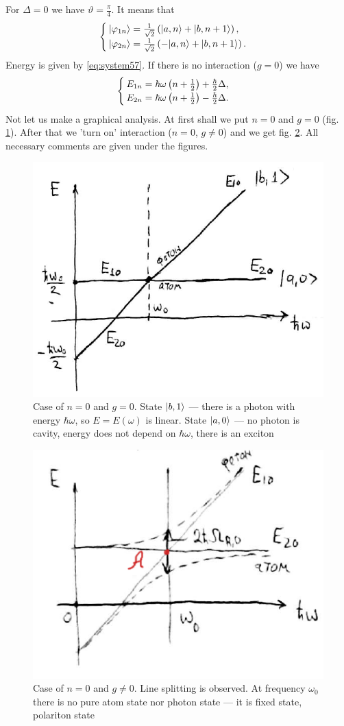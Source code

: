 For $\Delta = 0$ we have $\vartheta = \frac{\pi}{4}$. It means that
\begin{equation}
	\begin{cases}
		\lvert\varphi_{1n}\rangle = \frac{1}{\sqrt{2}} \left(\lvert a, n\rangle + \lvert b ,n +1\rangle\right), \\
		\lvert\varphi_{2n}\rangle = \frac{1}{\sqrt{2}}\left(-\lvert a, n\rangle + \lvert b ,n +1\rangle\right).
	\end{cases}
\end{equation}
Energy is given by \eqref{eq:system57}. If there is no interaction ($g = 0$) we have
\begin{equation}
	\begin{cases}
		E_{1n} = \hbar \omega \left( n + \frac{1}{2}\right) + \frac{\hbar}{2} \Delta, \\
		E_{2n} = \hbar \omega \left( n + \frac{1}{2}\right) - \frac{\hbar}{2} \Delta.
	\end{cases}
\end{equation}
Not let us make a graphical analysis. At first shall we put $n=0$ and $g=0$ (fig. \ref{fig:n0}). After that we 'turn on' interaction ($n=0$, $g \neq 0$) and we get fig. \ref{fig:n0gne0}. All necessary comments are given under the figures.

\begin{figure}
	\centering
	\includegraphics[width=0.5\linewidth]{fig/L6/n0}
	\caption{Case of $n=0$ and $g=0$. State $\lvert b,1\rangle$ --- there is a photon with energy $\hbar \omega$, so $E = E(\omega)$ is linear. State $\lvert a,0\rangle$ --- no photon is cavity, energy does not depend on $\hbar \omega$, there is an exciton}
	\label{fig:n0}
\end{figure}
\begin{figure}
	\centering
	\includegraphics[width=0.5\linewidth]{fig/L6/n0_g_ne0}
	\caption{Case of $n=0$ and $g\neq0$. Line splitting is observed. At frequency $\omega_0$ there is no pure atom state nor photon state --- it is fixed state, polariton state}
	\label{fig:n0gne0}
\end{figure}

